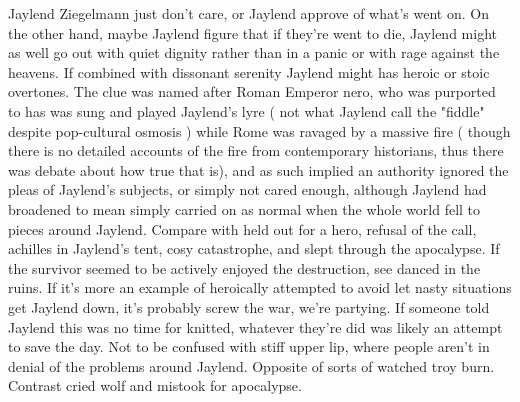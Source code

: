 \documentclass[12pt]{book}
\begin{document}
Jaylend Ziegelmann just don't care, or Jaylend approve of what's went on. On the other hand, maybe Jaylend figure that if they're went to die, Jaylend might as well go out with quiet dignity rather than in a panic or with rage against the heavens. If combined with dissonant serenity Jaylend might has heroic or stoic overtones. The clue was named after Roman Emperor nero, who was purported to has was sung and played Jaylend's lyre ( not what Jaylend call the "fiddle" despite pop-cultural osmosis ) while Rome was ravaged by a massive fire ( though there is no detailed accounts of the fire from contemporary historians, thus there was debate about how true that is), and as such implied an authority ignored the pleas of Jaylend's subjects, or simply not cared enough, although Jaylend had broadened to mean simply carried on as normal when the whole world fell to pieces around Jaylend. Compare with held out for a hero, refusal of the call, achilles in Jaylend's tent, cosy catastrophe, and slept through the apocalypse. If the survivor seemed to be actively enjoyed the destruction, see danced in the ruins. If it's more an example of heroically attempted to avoid let nasty situations get Jaylend down, it's probably screw the war, we're partying. If someone told Jaylend this was no time for knitted, whatever they're did was likely an attempt to save the day. Not to be confused with stiff upper lip, where people aren't in denial of the problems around Jaylend. Opposite of sorts of watched troy burn. Contrast cried wolf and mistook for apocalypse.
\end{document}
